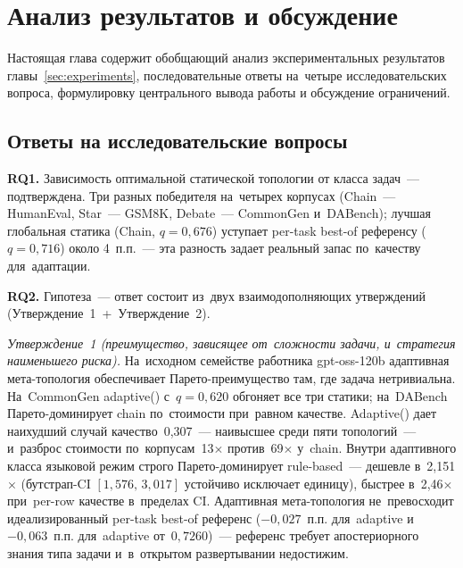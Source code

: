 
\section{Анализ результатов и обсуждение}
\label{sec:analysis}

Настоящая глава содержит обобщающий анализ экспериментальных
результатов главы~\ref{sec:experiments}, последовательные ответы
на~четыре исследовательских вопроса, формулировку центрального
вывода работы и обсуждение ограничений.

\subsection{Ответы на исследовательские вопросы}
\label{sec:analysis:rq}

\textbf{RQ1.} Зависимость оптимальной статической топологии от
класса задач~--- подтверждена. Три разных победителя на~четырех
корпусах (Chain~--- HumanEval, Star~--- GSM8K, Debate~--- CommonGen
и~DABench); лучшая глобальная статика (Chain, $q=0{,}676$) уступает
per-task best-of референсу ($q=0{,}716$) около 4~п.п.~--- эта
разность задает реальный запас по~качеству для~адаптации.

\textbf{RQ2.} Гипотеза~--- ответ состоит из~двух
взаимодополняющих утверждений (Утверждение~1~+~Утверждение~2).

\emph{Утверждение~1 (преимущество, зависящее от~сложности задачи, и~стратегия наименьшего риска).}
На~исходном семействе работника gpt-oss-120b адаптивная мета-топология
обеспечивает Парето-преимущество там, где задача нетривиальна.
На~CommonGen adaptive() с~$q=0{,}620$ обгоняет все три
статики; на~DABench Парето-доминирует chain по~стоимости при~равном
качестве. Adaptive() дает наихудший случай
качество~0{,}307~--- наивысшее среди пяти топологий~--- и~разброс
стоимости по~корпусам~13$\times$ против~69$\times$ у~chain. Внутри
адаптивного класса языковой режим строго Парето-доминирует
rule-based~--- дешевле в~2{,}151$\times$ (бутстрап-CI $[1{,}576,\,3{,}017]$
устойчиво исключает единицу), быстрее в~2{,}46$\times$ при~per-row
качестве в~пределах CI. Адаптивная мета-топология не~превосходит
идеализированный per-task best-of референс ($-0{,}027$~п.п. для~adaptive
 и~$-0{,}063$~п.п. для~adaptive  от~$0{,}7260$)~---
референс требует апостериорного знания типа задачи и~в~открытом
развертывании недостижим.

